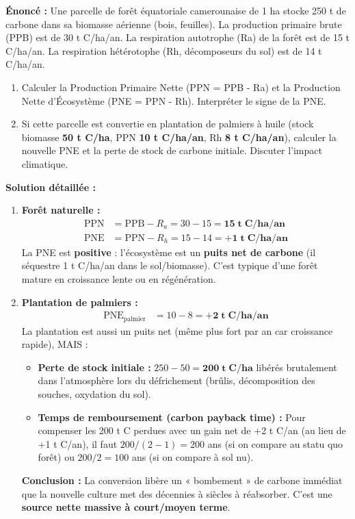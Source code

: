\documentclass[11pt]{article}
\begin{document}
\begin{exoresolu}
\textbf{Énoncé :} Une parcelle de forêt équatoriale camerounaise de 1 ha stocke 250 t de carbone dans sa biomasse aérienne (bois, feuilles). La production primaire brute (PPB) est de 30 t C/ha/an. La respiration autotrophe (Ra) de la forêt est de 15 t C/ha/an. La respiration hétérotophe (Rh, décomposeurs du sol) est de 14 t C/ha/an.
\begin{enumerate}
    \item Calculer la Production Primaire Nette (PPN = PPB - Ra) et la Production Nette d'Écosystème (PNE = PPN - Rh). Interpréter le signe de la PNE.
    \item Si cette parcelle est convertie en plantation de palmiers à huile (stock biomasse \textbf{50 t C/ha}, PPN \textbf{10 t C/ha/an}, Rh \textbf{8 t C/ha/an}), calculer la nouvelle PNE et la perte de stock de carbone initiale. Discuter l'impact climatique.
\end{enumerate}

\textbf{Solution détaillée :}
\tcblower
\begin{enumerate}
    \item \textbf{Forêt naturelle :}
    \begin{align*}
        \text{PPN} &= \text{PPB} - R_a = 30 - 15 = \mathbf{15\; t\; C/ha/an} \\
        \text{PNE} &= \text{PPN} - R_h = 15 - 14 = \mathbf{+1\; t\; C/ha/an}
    \end{align*}
    La PNE est \textbf{positive} : l'écosystème est un \textbf{puits net de carbone} (il séquestre 1 t C/ha/an dans le sol/biomasse). C'est typique d'une forêt mature en croissance lente ou en régénération.
    \item \textbf{Plantation de palmiers :}
    \begin{align*}
        \text{PNE}_{\text{palmier}} &= 10 - 8 = \mathbf{+2\; t\; C/ha/an}
    \end{align*}
    La plantation est aussi un puits net (même plus fort par an car croissance rapide), MAIS :
    \begin{itemize}
        \item \textbf{Perte de stock initiale :} $250 - 50 = \mathbf{200\; t\; C/ha}$ libérés brutalement dans l'atmosphère lors du défrichement (brûlis, décomposition des souches, oxydation du sol).
        \item \textbf{Temps de remboursement (carbon payback time) :} Pour compenser les 200 t C perdues avec un gain net de +2 t C/an (au lieu de +1 t C/an), il faut $200 / (2 - 1) = 200$ ans (si on compare au statu quo forêt) ou $200 / 2 = 100$ ans (si on compare à sol nu).
    \end{itemize}
    \textbf{Conclusion :} La conversion libère un « bombement » de carbone immédiat que la nouvelle culture met des décennies à siècles à réabsorber. C'est une \textbf{source nette massive à court/moyen terme}.
\end{enumerate}
\end{exoresolu}
\end{document}
